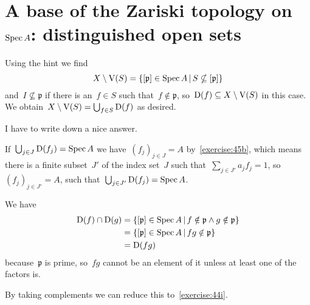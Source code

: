 \section{A base of the Zariski topology on \texorpdfstring{$\operatorname{Spec} A$}{Spec A}: distinguished open sets}

\begin{exercise}
  \label{exercise:45a}
  Using the hint we find
  \begin{equation}
    X\setminus\operatorname{V}(S)=\left\{ [\mathfrak{p}]\in\operatorname{Spec} A\,|\,S\nsubseteq[\mathfrak{p}] \right\}
  \end{equation}
  and~$I\nsubseteq\mathfrak{p}$ if there is an~$f\in S$ such that~$f\notin\mathfrak{p}$, so~$\operatorname{D}(f)\subseteq X\setminus\operatorname{V}(S)$ in this case. We obtain~$X\setminus\operatorname{V}(S)=\bigcup_{f\in S}\operatorname{D}(f)$ as desired.
\end{exercise}

\begin{exercise} %
  \label{exercise:45b}
  I have to write down a nice answer.
\end{exercise}

\begin{exercise}
  \label{exercise:45c}
  If~$\bigcup_{j\in J}\operatorname{D}(f_j)=\operatorname{Spec} A$ we have~$(f_j)_{j\in J}=A$ by~\autoref{exercise:45b}, which means there is a finite subset~$J'$ of the index set~$J$ such that~$\sum_{j\in J'}a_jf_j=1$, so~$(f_j)_{j\in J'}=A$, such that~$\bigcup_{j\in J'}\operatorname{D}(f_j)=\operatorname{Spec} A$.
\end{exercise}

\begin{exercise}
  We have
  \begin{equation}
    \begin{aligned}
      \operatorname{D}(f)\cap\operatorname{D}(g)&=\left\{ [\mathfrak{p}]\in\operatorname{Spec} A\,|\,f\notin\mathfrak{p}\wedge g\notin\mathfrak{p} \right\} \\
      &=\left\{ [\mathfrak{p}]\in\operatorname{Spec} A\,|\,fg\notin\mathfrak{p} \right\} \\
      &=\operatorname{D}(fg)
    \end{aligned}
  \end{equation}
  because~$\mathfrak{p}$ is prime, so~$fg$ cannot be an element of it unless at least one of the factors is.
\end{exercise}

\begin{exercise} %
  \label{exercise:45e}
  By taking complements we can reduce this to~\autoref{exercise:44i}.
\end{exercise}

